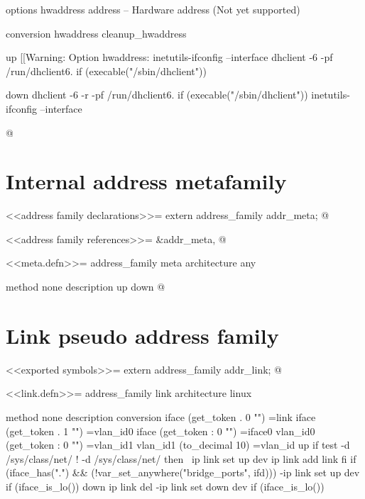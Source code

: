 \documentclass{article}
\begin{document}
  options
    hwaddress address      -- Hardware address (Not yet supported)

  conversion
    hwaddress cleanup_hwaddress

  up
    [[Warning: Option hwaddress: %
    inetutils-ifconfig --interface %
    dhclient -6 -pf /run/dhclient6.%
        if (execable("/sbin/dhclient"))

  down
    dhclient -6 -r -pf /run/dhclient6.%
        if (execable("/sbin/dhclient"))
    inetutils-ifconfig --interface %

@ 

\section{Internal address metafamily}

<<address family declarations>>=
extern address_family addr_meta;
@ 

<<address family references>>=
&addr_meta, 
@ 

<<meta.defn>>=
address_family meta
architecture any

method none
	description
	up
	down
@ 

\section{Link pseudo address family}

<<exported symbols>>=
extern address_family addr_link;
@ 

<<link.defn>>=
address_family link
architecture linux

method none
  description
  conversion
    iface (get_token . 0 "") =link
    iface (get_token . 1 "") =vlan_id0
    iface (get_token : 0 "") =iface0
    vlan_id0 (get_token : 0 "") =vlan_id1
    vlan_id1 (to_decimal 10) =vlan_id
  up
    if test -d /sys/class/net/%
            ! -d /sys/class/net/%
    then \
        ip link set up dev %
        ip link add link %
    fi if (iface_has(".") && (!var_set_anywhere("bridge_ports", ifd)))
    -ip link set up dev %
	if (iface_is_lo())
  down
    ip link del %
    -ip link set down dev %
	if (iface_is_lo())
\end{document}
